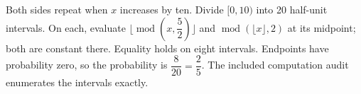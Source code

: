 Both sides repeat when $x$ increases by ten. Divide $[0,10)$ into 20 half-unit intervals. On each, evaluate $\lfloor\operatorname{mod}(x,\dfrac{5}{2})\rfloor$ and $\operatorname{mod}(\lfloor x\rfloor,2)$ at its midpoint; both are constant there. Equality holds on eight intervals. Endpoints have probability zero, so the probability is $\dfrac{8}{20}=\boxed{\dfrac{2}{5}}$. The included computation audit enumerates the intervals exactly.

